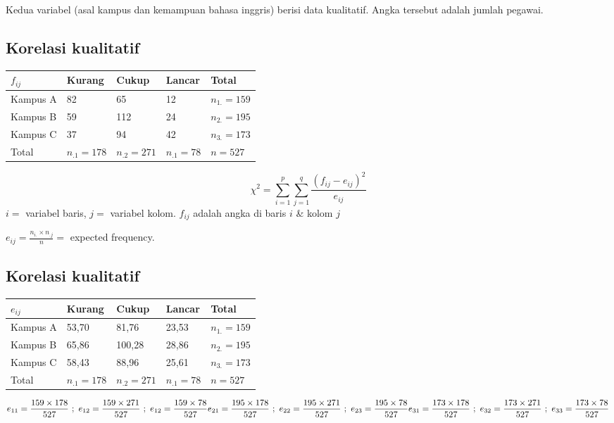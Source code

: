 \documentclass[
  letterpaper,
  DIV=11,
  numbers=noendperiod]{scrartcl}
\begin{document}
Kedua variabel (asal kampus dan kemampuan bahasa inggris) berisi data
kualitatif. Angka tersebut adalah jumlah pegawai.

\subsection{Korelasi kualitatif}\label{korelasi-kualitatif-1}

\begin{longtable}[]{@{}lllll@{}}
\toprule\noalign{}
\(f_{ij}\) & Kurang & Cukup & Lancar & Total \\
\midrule\noalign{}
\endhead
\bottomrule\noalign{}
\endlastfoot
Kampus A & 82 & 65 & 12 & \(n_{1.}=159\) \\
Kampus B & 59 & 112 & 24 & \(n_{2.}=195\) \\
Kampus C & 37 & 94 & 42 & \(n_{3.}=173\) \\
Total & \(n_{.1}=178\) & \(n_{.2}=271\) & \(n_{.1}=78\) & \(n=527\) \\
\end{longtable}

\[
\chi^2=\sum_{i=1}^{p} \sum_{j=1}^{q} \frac{(f_{ij}-e_{ij})^2}{e_{ij}}
\] \(i=\) variabel baris, \(j=\) variabel kolom. \(f_{ij}\) adalah angka
di baris \(i\) \& kolom \(j\)

\(e_{ij}=\frac{n_{i.}\times n_{.j}}{n}=\) expected frequency.

\subsection{Korelasi kualitatif}\label{korelasi-kualitatif-2}

\begin{longtable}[]{@{}lllll@{}}
\toprule\noalign{}
\(e_{ij}\) & Kurang & Cukup & Lancar & Total \\
\midrule\noalign{}
\endhead
\bottomrule\noalign{}
\endlastfoot
Kampus A & 53,70 & 81,76 & 23,53 & \(n_{1.}=159\) \\
Kampus B & 65,86 & 100,28 & 28,86 & \(n_{2.}=195\) \\
Kampus C & 58,43 & 88,96 & 25,61 & \(n_{3.}=173\) \\
Total & \(n_{.1}=178\) & \(n_{.2}=271\) & \(n_{.1}=78\) & \(n=527\) \\
\end{longtable}

\[
e_{11}=\frac{159 \times 178}{527} \ ; \ e_{12}=\frac{159 \times 271}{527} \ ; \ e_{12}=\frac{159 \times 78}{527} \\ e_{21}=\frac{195 \times 178}{527} \ ; \ e_{22}=\frac{195 \times 271}{527} \ ; \ e_{23}=\frac{195 \times 78}{527} \\ e_{31}=\frac{173 \times 178}{527} \ ; \ e_{32}=\frac{173 \times 271}{527} \ ; \ e_{33}=\frac{173 \times 78}{527}
\]
\end{document}
